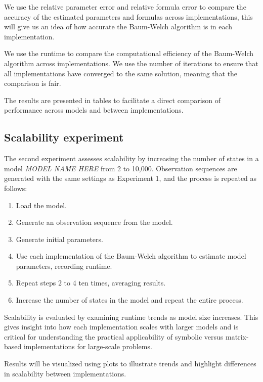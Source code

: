 We use the relative parameter error and relative formula error to compare the accuracy of the estimated parameters and formulas across implementations, this will give us an idea of how accurate the Baum-Welch algorithm is in each implementation.

We use the runtime to compare the computational efficiency of the Baum-Welch algorithm across implementations.
We use the number of iterations to ensure that all implementations have converged to the same solution, meaning that the comparison is fair.

The results are presented in tables to facilitate a direct comparison of performance across models and between implementations.

\subsection{Scalability experiment}
The second experiment assesses scalability by increasing the number of states in a model \textit{MODEL NAME HERE} from 2 to 10,000. 
Observation sequences are generated with the same settings as Experiment 1, and the process is repeated as follows:

\begin{enumerate}
    \item Load the model.
    \item Generate an observation sequence from the model.
    \item Generate initial parameters.
    \item Use each implementation of the Baum-Welch algorithm to estimate model parameters, recording runtime.
    \item Repeat steps 2 to 4 ten times, averaging results.
    \item Increase the number of states in the model and repeat the entire process.
\end{enumerate}

Scalability is evaluated by examining runtime trends as model size increases. 
This gives insight into how each implementation scales with larger models and is critical for understanding the practical applicability of symbolic versus matrix-based implementations for large-scale problems.

Results will be visualized using plots to illustrate trends and highlight differences in scalability between implementations.

